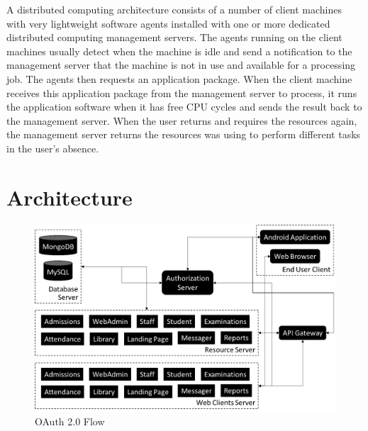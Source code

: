 \par
A distributed computing architecture consists of a number of client machines with very lightweight software agents installed with one or more dedicated distributed computing management servers. The agents running on the client machines usually detect when the machine is idle and send a notification to the management server that the machine is not in use and available for a processing job. The agents then requests an application package. When the client machine receives this application package from the management server to process, it runs the application software when it has free CPU cycles and sends the result back to the management server. When the user returns and requires the resources again, the management server returns the resources was using to perform different tasks in the user's absence.
\section{Architecture}
\begin{figure}[ht]
\centering
\includegraphics[width=35em]{figures/figure6.png}
\caption{OAuth 2.0 Flow}
\end{figure}